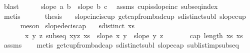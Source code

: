 \begin{isabellebody}
\ blast\isanewline
\ \ \ \ \isamarkupfalse%
\ {\isachardoublequoteopen}slope\ a\ b\ {\isacharless}{\kern0pt}\ slope\ b\ c{\isachardoublequoteclose}\ \isamarkupfalse%
\ assms{\isacharparenleft}{\kern0pt}{}{\isacharparenright}{\kern0pt}\ cup{\isacharunderscore}{\kern0pt}is{\isacharunderscore}{\kern0pt}slopeinc\ subseq{\isacharunderscore}{\kern0pt}index{}\isanewline
\ \ \ \ \ \ \isamarkupfalse%
\ metis\isanewline
\ \ \isamarkupfalse%
\isanewline
\ \ \isamarkupfalse%
\ {\isacharquery}{\kern0pt}thesis\ \isamarkupfalse%
\ {}\ slopeinc{\isacharunderscore}{\kern0pt}is{\isacharunderscore}{\kern0pt}cup\ get{\isacharunderscore}{\kern0pt}cap{\isacharunderscore}{\kern0pt}from{\isacharunderscore}{\kern0pt}bad{\isacharunderscore}{\kern0pt}cup\ sdistinct{\isacharunderscore}{\kern0pt}subl\ slope{\isacharunderscore}{\kern0pt}cup{}\isanewline
\ \ \ \ \isamarkupfalse%
\ meson\isanewline
{}\isamarkupfalse%
%
\endisatagproof
{\isafoldproof}%
%
\isadelimproof
\isanewline
%
\endisadelimproof
\isanewline
\isanewline
\isanewline
{}\isamarkupfalse%
\ slopedec{\isacharunderscore}{\kern0pt}is{\isacharunderscore}{\kern0pt}cap{\isacharcolon}{\kern0pt}\isanewline
\ \ \ {\isachardoublequoteopen}sdistinct\ xs{\isachardoublequoteclose}\ \isanewline
\ \ \ \ \ \ \ {\isachardoublequoteopen}{\isasymforall}x\ y\ z{\isachardot}{\kern0pt}\ subseq\ {\isacharbrackleft}{\kern0pt}x{\isacharcomma}{\kern0pt}y{\isacharcomma}{\kern0pt}z{\isacharbrackright}{\kern0pt}\ xs\ {\isasymlongrightarrow}\ slope\ x\ y\ {\isachargreater}{\kern0pt}\ slope\ y\ z{\isachardoublequoteclose}\isanewline
\ \ \ \ \ \ \ {\isachardoublequoteopen}cap\ {\isacharparenleft}{\kern0pt}length\ xs{\isacharparenright}{\kern0pt}\ xs{\isachardoublequoteclose}\isanewline
%
\isadelimproof
\ \ %
\endisadelimproof
%
\isatagproof
{}\isamarkupfalse%
\ assms\isanewline
\ \ \isamarkupfalse%
\ {\isacharparenleft}{\kern0pt}metis\ get{\isacharunderscore}{\kern0pt}cup{\isacharunderscore}{\kern0pt}from{\isacharunderscore}{\kern0pt}bad{\isacharunderscore}{\kern0pt}cap\ sdistinct{\isacharunderscore}{\kern0pt}subl\ slope{\isacharunderscore}{\kern0pt}cap{}\ sublist{\isacharunderscore}{\kern0pt}imp{\isacharunderscore}{\kern0pt}subseq{\isacharparenright}{\kern0pt}%
\endisatagproof
{\isafoldproof}%
%
\isadelimproof
\isanewline

\end{isabellebody}
